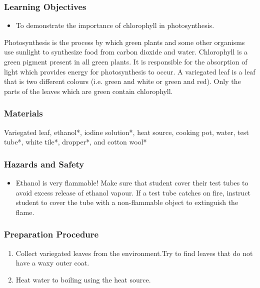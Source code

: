 \subsubsection*{Learning Objectives}
\begin{itemize}
\item{To demonstrate the importance of chlorophyll in photosynthesis.}
\end{itemize}


Photosynthesis is the process by which green plants and some other organisms use sunlight to synthesize food from carbon dioxide and water. Chlorophyll is a green pigment present in all green plants. It is responsible for the absorption of light which provides energy for photosynthesis to occur. A variegated leaf is a leaf that is two different colours (i.e. green and white or green and red). Only the parts of the leaves which are green contain chlorophyll.

\subsubsection*{Materials}
Variegated leaf, ethanol*, iodine solution*, heat source, cooking pot, water, test tube*, white tile*, dropper*, and cotton wool*

\subsubsection*{Hazards and Safety}
\begin{itemize}
\item{Ethanol is very flammable! Make sure that student cover their test tubes to avoid excess release of ethanol vapour. If a test tube catches on fire, instruct student to cover the tube with a non-flammable object to extinguish the flame.}
\end{itemize}

\subsubsection*{Preparation Procedure}
\begin{enumerate}
\item{Collect variegated leaves from the environment.Try to find leaves that do not have a waxy outer coat.}
\item{Heat water to boiling using the heat source.}
\end{enumerate}

